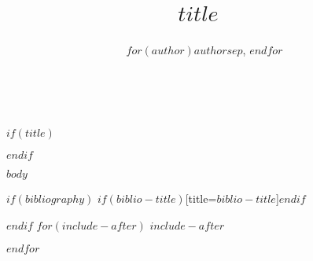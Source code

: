 \documentclass[$if(classoption)$$for(classoption)$$classoption$$sep$,$endfor$,jou,longtable$else$jou,longtable$endif$]{apa6}
\title{$title$}
\title{~}$endif$
\author{$for(author)$$author$$sep$, $endfor$}
\author{~}$endif$
\affiliation{$for(institute)$$institute$$sep$\\ $endfor$}
\affiliation{~}$endif$
\begin{document}
$if(title)$\maketitle$endif$

$body$

$if(bibliography)$
\printbibliography$if(biblio-title)$[title=$biblio-title$]$endif$

$endif$
$for(include-after)$
$include-after$

$endfor$
\end{document}
